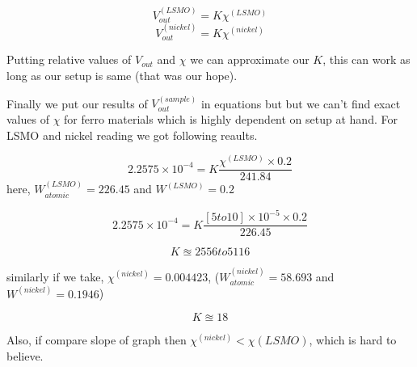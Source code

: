 \documentclass[a4paper,11pt]{article}
\begin{document}
\begin{equation*}
V_{out}^{(LSMO)} = K \chi^{(LSMO)}
\end{equation*}
\begin{equation*}
V_{out}^{(nickel)} = K \chi^{(nickel)}
\end{equation*}

Putting relative values of \(V_{out}\) and \(\chi\) we can approximate our \(K\), this can work as long as our setup is same (that was our hope).

Finally we put our results of \(V_{out}^{(sample)}\) in equations but but we can't find exact values of \(\chi\) for ferro materials which is highly dependent on setup at hand. For LSMO and nickel reading we got following reaults.


\begin{equation*}
2.2575 \times 10^{-4} =  K \frac{\chi^{(LSMO)} \times 0.2}{241.84}
\end{equation*}
here, \(W_{atomic}^{(LSMO)}=226.45\) and \(W^{(LSMO)}=0.2\) 

\begin{equation*}
2.2575 \times 10^{-4} = K \frac{[5 to 10] \times 10^{-5} \times 0.2}{226.45}
\end{equation*}


\begin{equation*}
K \approxeq 2556   to   5116
\end{equation*}

similarly if we take, \(\chi^{(nickel)}= 0.004423\), (\(W_{atomic}^{(nickel)}=58.693\) and \(W^{(nickel)} = 0.1946\))

\begin{equation*}
K \approxeq 18
\end{equation*}


Also, if compare slope of graph then \(\chi^{(nickel)} < \chi{(LSMO)}\), which is hard to believe.
\end{document}

